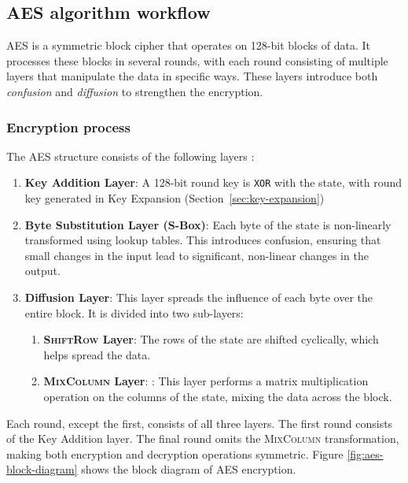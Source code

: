 \subsection{AES algorithm workflow}

\Gls{AES} is a symmetric block cipher that operates on 128-bit blocks of data.
It processes these blocks in several rounds, with each round consisting of multiple layers that manipulate the data in specific ways. 
These layers introduce both \textit{confusion} and \textit{diffusion} to strengthen the encryption.

\subsubsection{Encryption process}

The AES structure consists of the following layers \cite{Paar2024}:
\begin{enumerate}
    \item \textbf{Key Addition Layer}:
    A 128-bit round key is \texttt{XOR} with the state, with round key generated in Key Expansion (Section~\ref{sec:key-expansion})

    \item \textbf{Byte Substitution Layer (S-Box)}:
    Each byte of the state is non-linearly transformed using lookup tables. 
    This introduces confusion, ensuring that small changes in the input lead to significant, non-linear changes in the output.
    
    \item \textbf{Diffusion Layer}:
    This layer spreads the influence of each byte over the entire block. 
    It is divided into two sub-layers:
    \begin{enumerate}
        \item \textbf{\textsc{ShiftRow} Layer}: The rows of the state are shifted cyclically, which helps spread the data. %
        \item \textbf{\textsc{MixColumn} Layer}: : This layer performs a matrix multiplication operation on the columns of the state, mixing the data across the block. %
    \end{enumerate}
\end{enumerate}

Each round, except the first, consists of all three layers. 
The first round consists of the Key Addition layer.
The final round omits the \textsc{MixColumn} transformation, making both encryption and decryption operations symmetric.
Figure \ref{fig:aes-block-diagram} shows the block diagram of AES encryption.

